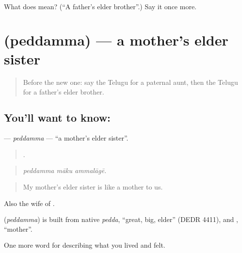 \begin{tcolorbox}[breakable,colback=teal!4,colframe=teal!35!black,title={Before you move on}]
What does  mean? (\textquotedblleft{}A father's elder brother\textquotedblright{}.) Say it once more.
\end{tcolorbox}
\section[\texorpdfstring{\te{పెద్దమ్మ} (peddamma)}{పెద్దమ్మ (peddamma)}]{ (peddamma) — a mother's elder sister}

\label{lesson:TE-C529-peddamma}



\begin{quote}
Before the new one: say the Telugu for a paternal aunt, then the Telugu for a father's elder brother.
\end{quote}

\subsection*{You'll want to know: }
\textbf{} — \emph{peddamma} — \textquotedblleft{}a mother's elder sister\textquotedblright{}.

\begin{quote}
  .
\end{quote}

\begin{quote}
\emph{peddamma māku ammalāgē.}
\end{quote}

\begin{quote}
My mother's elder sister is like a mother to us.
\end{quote}

Also the wife of .

\begin{cousinweb}
\textbf{} (\emph{peddamma}) is built from native \emph{pedda}, \textquotedblleft{}great, big, elder\textquotedblright{} (DEDR 4411), and , \textquotedblleft{}mother\textquotedblright{}.
\end{cousinweb}

\begin{grammarlens}[title={What you've built}]
One more word for describing what you lived and felt.
\end{grammarlens}

